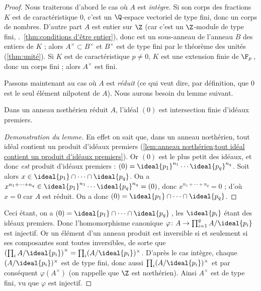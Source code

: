 \documentclass[11pt, useosf,
  title in boldface,
  theorem in new line,
  theorem numbering = section,
  number theorems separately,
]{simplivre}
\begin{document}
    \begin{proof}
        Nous traiterons d'abord le cas où \( A \) est \emph{intègre}. Si son corps des fractions \( K \) est de caractéristique \( 0 \), c'est un \( \Q \)‑espace vectoriel de type fini, donc un corps de nombres. D'autre part \( A \) est entier sur \( \Z \) (car c'est un \( \Z \)‑module de type fini, \cf.~\cref{thm:conditions d'être entier}), donc est un sous-anneau de l'anneau \( B \) des entiers de \( K \) ; alors \( A^\times \subset B^\times \) et \( B^\times \) est de type fini par le théorème des unités (\cref{thm:unité}). Si \( K \) est de caractéristique \( p \neq 0 \), \( K \) est une extension finie de \( \F_p \)\,, donc un corps fini ; alors \( A^\times \) est fini.

        Passons maintenant au cas où \( A \) est \emph{réduit} (ce qui veut dire, par définition, que \( 0 \) est le seul élément nilpotent de \( A \)). Nous aurons besoin du lemme suivant.

        \begin{lemma*}
            Dans un anneau nœthérien réduit \( A \), l'idéal \( (0) \) est intersection finie d'idéaux \mbox{premiers}.
        \end{lemma*}
        \begin{proof}[Demonstration du lemme]
            En effet on sait que, dans un anneau nœthérien, tout idéal contient un produit d'idéaux premiers (\cref{lem:anneau nœthérien;tout idéal contient un produit d'idéaux premiers}). Or \( (0) \) est le plus petit des idéaux, et donc \emph{est} produit d'idéaux premiers : \( (0) = \ideal{p_1}^{n_1} \cdots \ideal{p_q}^{n_q} \). Soit alors \( x \in \ideal{p_1} \cap \cdots \cap \ideal{p_q} \). On a \( x^{n_1 + \cdots + n_q} \in \ideal{p_1}^{n_1} \cdots \ideal{p_q}^{n_q} = (0) \), donc \( x^{n_1 + \cdots + n_q} = 0 \) ; d'où \( x = 0 \) car \( A \) est réduit. On a donc \( (0) = \ideal{p_1} \cap \cdots \cap \ideal{p_q} \).
        \end{proof}

        Ceci étant, on a \( (0) = \ideal{p_1} \cap \cdots \cap \ideal{p_q} \)\,, les \( \ideal{p_i} \) étant des idéaux premiers. Donc l'homomorphisme canonique \( \varphi \colon A \to \prod_{i=1}^q A/\ideal{p_i} \) est injectif. Or un élément d'un anneau produit est inversible si et seulement si ses composantes sont toutes inversibles, de sorte que \( \left(\prod_i A/\ideal{p_i}\right)^\times = \prod_i (A/\ideal{p_i})^\times \). D'après le cas intègre, chaque \( (A/\ideal{p_i})^\times \) est de type fini, donc aussi \( \prod_i (A/\ideal{p_i})^\times \) et par conséquent \( \varphi(A^\times) \) (on rappelle que \( \Z \) est nœthérien). Ainsi \( A^\times \) est de type fini, vu que \( \varphi \) est injectif.


\end{proof}
\end{document}
